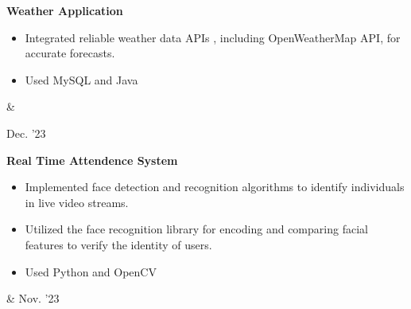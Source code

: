 \documentclass[10pt, letterpaper]{article}
\newenvironment{highlights}{
        \begin{itemize}[
                topsep=0pt,
                parsep=0.10 cm,
                partopsep=0pt,
                itemsep=0pt,
                after=\vspace{-1\baselineskip},
                leftmargin=0.4 cm + 3pt
            ]
    }{
        \end{itemize}
    } %
\let\originalTabularx\tabularx
\let\originalEndTabularx\endtabularx
\renewenvironment{tabularx}{\bgroup\centering\originalTabularx}{\originalEndTabularx\par\egroup}
\begin{document}
        \vspace{0.2 cm}
        \begin{tabularx}{
            \textwidth-0.4 cm-0.13cm
        }{
            K{0.2 cm}
            R{4.1 cm}
        }
            \textbf{Weather Application}

            \vspace{0.10 cm}

            \begin{highlights}
                \item 
                    Integrated reliable weather data APIs , including OpenWeatherMap API, for accurate forecasts.

                \item Used  MySQL and Java 
            \end{highlights}
            &
            

            Dec.  '23
        \end{tabularx}


        \vspace{0.2 cm}
        
        \begin{tabularx}{
            \textwidth-0.4 cm-0.13cm
        }{
            K{0.2 cm}
            R{4.1 cm}
        }
            \textbf{Real Time Attendence System}

            \vspace{0.10 cm}

            \begin{highlights}
                \item  
                    Implemented face detection and recognition algorithms to identify individuals in live video streams.
                \item 
                Utilized the face recognition library for encoding and comparing facial features to verify the identity of users.
                \item  
                    Used Python and OpenCV 
               
            \end{highlights}
            &
            Nov.  '23
        \end{tabularx}
\end{document}
